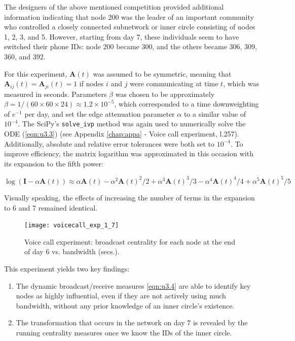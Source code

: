 The designers of the above mentioned competition provided additional information indicating that node 200 was the leader of an important community who controlled a closely connected subnetwork or inner circle consisting of nodes 1, 2, 3, and 5. However, starting from day 7, these individuals seem to have switched their phone IDs: node 200 became 300, and the others became 306, 309, 360, and 392.

For this experiment, $\mathbf{A}(t)$ was assumed to be symmetric, meaning that $\mathbf{A}_{ij}(t) = \mathbf{A}_{ji}(t) = 1$ if nodes $i$ and $j$ were communicating at time $t$, which was measured in seconds. Parameters $\beta$ was chosen to be approximately $\beta = 1/(60\times 60 \times 24) \approx 1.2 \times 10^{-5}$, which corresponded to a time downweighting of $e^{-1}$ per day, and set the edge attenuation parameter $\alpha$ to a similar value of $10^{-4}$. The SciPy's \texttt{solve\_ivp} method was again used to numerically solve the ODE (\ref{eqn:u3.3}) (see Appendix \ref{chap:appa} - Voice call experiment, l.257). Additionally, absolute and relative error tolerances were both set to $10^{-4}$. To improve efficiency, the matrix logarithm was approximated in this occasion with its expansion to the fifth power:

$$\log(\mathbf{I} - \alpha \mathbf{A}(t)) \approx \alpha \mathbf{A}(t) - \alpha^2 \mathbf{A}(t)^2/2 + \alpha^3 \mathbf{A}(t)^3/3 - \alpha^4 \mathbf{A}(t)^4/4 + \alpha^5 \mathbf{A}(t)^5/5$$ 

Visually speaking, the effects of increasing the number of terms in the expansion to 6 and 7 remained identical.

\begin{figure}[h]\centering
    \texttt{[image: voicecall\_exp\_1\_7]}
    \caption{Voice call experiment: broadcast centrality for each node at the end of day 6 vs. bandwidth (secs.).}
    \label{fig:ve1a}
    \bigskip
\end{figure}

This experiment yields two key findings:
\begin{enumerate}[label=(\roman*)]
  \item The dynamic broadcast/receive measures \eqref{eqn:u3.4} are able to identify key nodes as highly influential, even if they are not actively using much bandwidth, without any prior knowledge of an inner circle's existence.
  \item The transformation that occurs in the network on day 7 is revealed by the running centrality measures once we know the IDs of the inner circle.
\end{enumerate}

